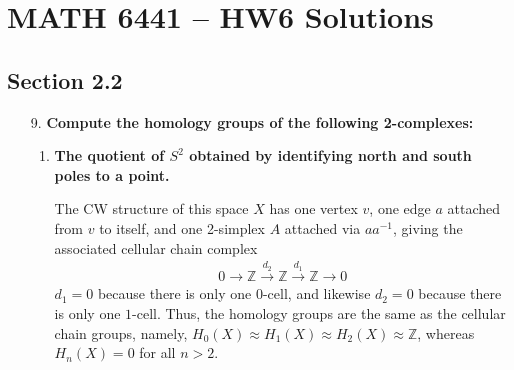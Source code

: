 \documentclass[a4paper,12pt]{article}
\begin{document}
\section*{MATH 6441 -- HW6 Solutions}
\subsection*{Section 2.2}
\begin{enumerate}
    \item[9.]
        \boldmath\textbf{Compute the homology groups of the following 2-complexes:
        }\unboldmath \par
        \begin{enumerate}[label=(\alph*)]
            \item
                \boldmath\textbf{The quotient of $S^2$ obtained by identifying north and south poles to a point.
                }\unboldmath \par
                The CW structure of this space $X$ has one vertex $v$, one edge $a$ attached from $v$ to itself, and one 2-simplex $A$ attached via $aa^{-1}$, giving the associated cellular chain complex
                \begin{align*}
                    0 \rightarrow \mathbb{Z} \xrightarrow{d_2} \mathbb{Z} \xrightarrow{d_1} \mathbb{Z} \rightarrow 0
                \end{align*}
                $d_1 = 0$ because there is only one $0$-cell, and likewise $d_2 = 0$ because there is only one $1$-cell. Thus, the homology groups are the same as the cellular chain groups, namely, $H_0(X) \approx H_1(X) \approx H_2(X) \approx \mathbb{Z}$, whereas $H_n(X) = 0$ for all $n > 2$.


\end{enumerate}
\end{enumerate}
\end{document}

